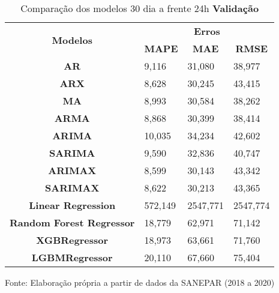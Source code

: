\begin{table}[H]
	\centering
	\caption{Comparação dos modelos 30 dia a frente 24h \textbf{Validação} }\label{tb:30-24vld}
	\begin{tabular}{@{}clll@{}}
		\toprule
		\multirow{2}{*}{\textbf{Modelos}} & \multicolumn{3}{c}{\textbf{Erros}}                                                                       \\ \cmidrule(l){2-4} 
		& \multicolumn{1}{c}{\textbf{MAPE}} & \multicolumn{1}{c}{\textbf{MAE}} & \multicolumn{1}{c}{\textbf{RMSE}} \\ \hline
\textbf{AR}                       & 9,116                             & 31,080                           & 38,977                            \\
\textbf{ARX}                      & 8,628                             & 30,245                           & 43,415                            \\
\textbf{MA}                       & 8,993                             & 30,584                           & 38,262                            \\
\textbf{ARMA}                     & 8,868                             & 30,399                           & 38,414                            \\
\textbf{ARIMA}                    & 10,035                            & 34,234                           & 42,602                            \\
\textbf{SARIMA}                   & 9,590                             & 32,836                           & 40,747                            \\
\textbf{ARIMAX}                   & 8,599                             & 30,143                           & 43,342                            \\
\textbf{SARIMAX}                  & 8,622                             & 30,213                           & 43,365                            \\
\textbf{Linear Regression}        & 572,149                           & 2547,771                         & 2547,774                          \\
\textbf{Random Forest Regressor}  & 18,779                            & 62,971                           & 71,142                            \\
\textbf{XGBRegressor}             & 18,973                            & 63,661                           & 71,760                            \\
\textbf{LGBMRegressor}            & 20,110                            & 67,660                           & 75,404                            \\ \bottomrule
	\end{tabular}

Fonte: Elaboração própria a partir de dados da SANEPAR (2018 a 2020)
\end{table}


